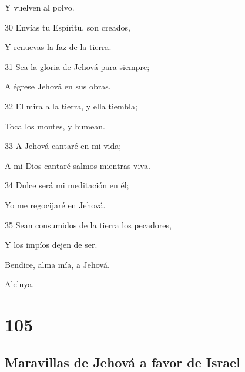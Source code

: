 \par Y vuelven al polvo.
\par 30 Envías tu Espíritu, son creados,
\par Y renuevas la faz de la tierra.
\par 31 Sea la gloria de Jehová para siempre;
\par Alégrese Jehová en sus obras.
\par 32 El mira a la tierra, y ella tiembla;
\par Toca los montes, y humean.
\par 33 A Jehová cantaré en mi vida;
\par A mi Dios cantaré salmos mientras viva.
\par 34 Dulce será mi meditación en él;
\par Yo me regocijaré en Jehová.
\par 35 Sean consumidos de la tierra los pecadores,
\par Y los impíos dejen de ser.
\par Bendice, alma mía, a Jehová.
\par Aleluya.

\chapter{105}

\section*{Maravillas de Jehová a favor de Israel}

